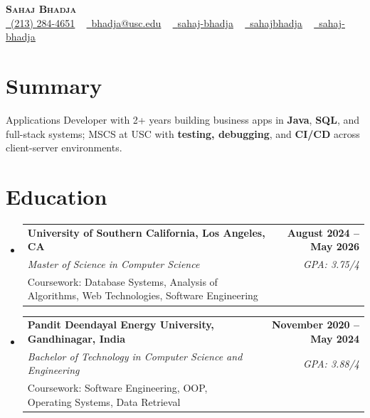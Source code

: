 \documentclass[letterpaper,10pt]{article}
\makeatletter
\newcommand{\resumeEduSubheading}[5]{\vspace{-1pt}\item\begin{tabular*}{1.0\textwidth}[t]{l@{\extracolsep{\fill}}r}\textbf{#1} & \textbf{\small #2} \\\textit{\small #3} & \textit{\small #4} \\\small #5 & \\\end{tabular*}\vspace{-4pt}}
\newcommand{\resumeSubHeadingListStart}{\begin{itemize}[leftmargin=0.0in, label={}]}
\newcommand{\resumeSubHeadingListEnd}{\end{itemize}}
\makeatother
\begin{document}
\begin{center}
{\Huge \scshape \textbf{Sahaj Bhadja}} \\ \vspace{1pt}
\small \href{tel:(213) 284-4651}{\faPhone\ \underline{(213) 284-4651}} ~ \href{mailto: bhadja@usc.edu}{\raisebox{-0.2\height}\faEnvelope\ \underline{bhadja@usc.edu}} ~
\href{https://www.linkedin.com/in/sahaj-bhadja/}{\raisebox{-0.2\height}\faLinkedin\ \underline{sahaj-bhadja}} ~ \href{https://github.com/SAHAJ-BHADJA}{\raisebox{-0.2\height}\faGithub\ \underline{sahajbhadja}} ~
\href{https://sahaj-bhadja.vercel.app/}{\raisebox{-0.2\height}\faGlobe\ \underline{sahaj-bhadja}}
\end{center}
\vspace{-16pt}
\section{Summary}
\begin{itemize}[leftmargin=0.15in, label={}]
\small{\item{Applications Developer with 2+ years building business apps in \textbf{Java}, \textbf{SQL}, and full-stack systems; MSCS at USC with \textbf{testing, debugging}, and \textbf{CI/CD} across client-server environments.}}
\end{itemize}
\vspace{-6pt}
\section{Education}
\resumeSubHeadingListStart
\resumeEduSubheading{University of Southern California, Los Angeles, CA}{August 2024 -- May 2026}{Master of Science in Computer Science}{GPA: 3.75/4}{Coursework: Database Systems, Analysis of Algorithms, Web Technologies, Software Engineering}
\vspace{-9pt}
\resumeEduSubheading{Pandit Deendayal Energy University, Gandhinagar, India}{November 2020 -- May 2024}{Bachelor of Technology in Computer Science and Engineering}{GPA: 3.88/4}{Coursework: Software Engineering, OOP, Operating Systems, Data Retrieval}
\resumeSubHeadingListEnd
\vspace{-6pt}
\end{document}
